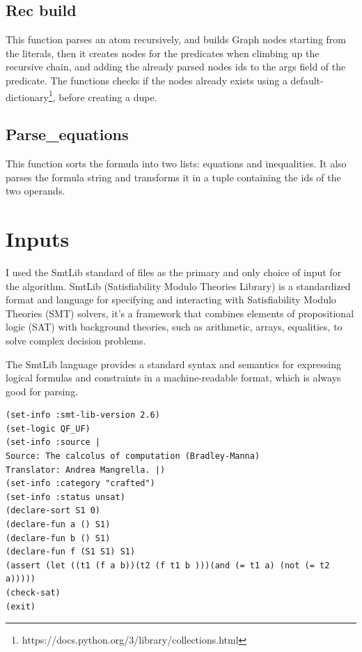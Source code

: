\documentclass[a4paper]{article}
\begin{document}
\subsection{Rec build}
This function parses an atom recursively, and builds Graph nodes starting from the literals, then it creates nodes for the predicates when climbing up the recursive chain, and adding the already parsed nodes ids to the args field of the predicate. The functions checks if the nodes already exists using a default-dictionary\footnote{https://docs.python.org/3/library/collections.html}, before creating a dupe.

\subsection{Parse\_equations}
This function sorts the formula into two lists: equations and inequalities. It also parses the formula string and transforms it in a tuple containing the ids of the two operands. 

\section{Inputs}\label{sec:input}
I used the SmtLib standard of files as the primary and only choice of input for the algorithm.
SmtLib (Satisfiability Modulo Theories Library) is a standardized format and language for specifying and interacting with Satisfiability Modulo Theories (SMT) solvers, it's a framework that combines elements of propositional logic (SAT) with background theories, such as arithmetic, arrays, equalities, to solve complex decision problems. 

\noindent
The SmtLib language provides a standard syntax and semantics for expressing logical formulas and constraints in a machine-readable format, which is always good for parsing.
\begin{lstlisting}[caption=Example of a SmtLib file, label={lst:smt}]
(set-info :smt-lib-version 2.6)
(set-logic QF_UF)
(set-info :source |
Source: The calcolus of computation (Bradley-Manna) 
Translator: Andrea Mangrella. |)
(set-info :category "crafted")
(set-info :status unsat)
(declare-sort S1 0)
(declare-fun a () S1)
(declare-fun b () S1)
(declare-fun f (S1 S1) S1)
(assert (let ((t1 (f a b))(t2 (f t1 b )))(and (= t1 a) (not (= t2 a)))))
(check-sat)
(exit)
\end{lstlisting}
\end{document}
